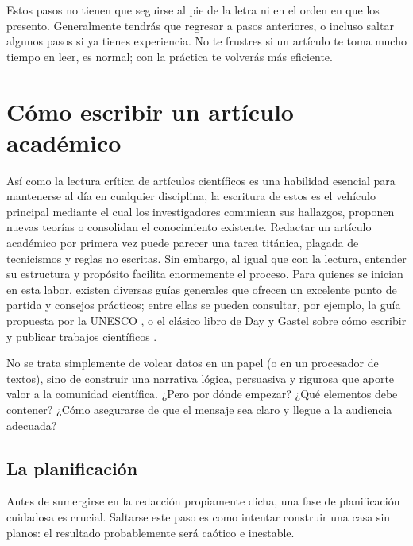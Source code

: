 Estos pasos no tienen que seguirse al pie de la letra ni en el orden en que los
presento.
Generalmente tendrás que regresar a pasos anteriores, o incluso saltar algunos
pasos si ya tienes experiencia.
No te frustres si un artículo te toma mucho tiempo en leer, es normal; con la
práctica te volverás más eficiente.

\section{Cómo escribir un artículo académico}
\label{sec:comoescribir}

Así como la lectura crítica de artículos científicos es una habilidad esencial para
mantenerse al día en cualquier disciplina, la escritura de estos es el vehículo
principal mediante el cual los investigadores comunican sus hallazgos, proponen
nuevas teorías o consolidan el conocimiento existente.
Redactar un artículo académico por primera vez puede parecer una tarea titánica,
plagada de tecnicismos y reglas no escritas.
Sin embargo, al igual que con la lectura, entender su estructura y propósito
facilita enormemente el proceso. Para quienes se inician en esta labor, existen
diversas guías generales que ofrecen un excelente punto de partida y consejos
prácticos; entre ellas se pueden consultar, por ejemplo, la guía propuesta por
la UNESCO \cite{Unesco1983GuiaRedaccion}, o el clásico libro de Day y Gastel
sobre cómo escribir y publicar trabajos científicos
\cite{DayGastel2022HowToWrite}.

No se trata simplemente de volcar datos en un papel (o en un procesador de
textos), sino de construir una narrativa lógica, persuasiva y rigurosa que
aporte valor a la comunidad científica.
¿Pero por dónde empezar? ¿Qué elementos debe contener?
¿Cómo asegurarse de que el mensaje sea claro y llegue a la audiencia adecuada?

\subsection*{La planificación}
\label{sub:planificacionarticulo}

Antes de sumergirse en la redacción propiamente dicha, una fase de planificación
cuidadosa es crucial.
Saltarse este paso es como intentar construir una casa sin planos: el resultado
probablemente será caótico e inestable.

